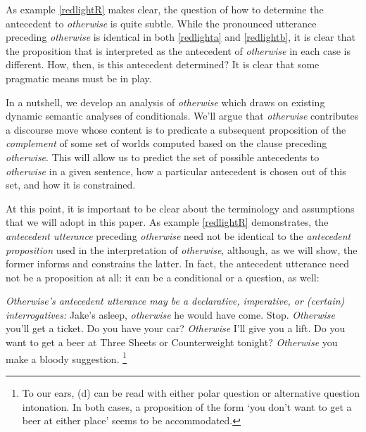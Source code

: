 
As example \ref{redlightR} makes clear, the question of how to determine the antecedent to \textit{otherwise} is quite subtle. While the pronounced utterance preceding \textit{otherwise} is identical in both \ref{redlighta} and \ref{redlightb}, it is clear that the proposition that is interpreted as the antecedent of \textit{otherwise} in each case is different. How, then, is this antecedent determined? It is clear that some pragmatic means must be in play.

In a nutshell, we develop an analysis of \textit{otherwise} which draws on existing dynamic semantic analyses of conditionals. We'll argue that \textit{otherwise} contributes a discourse move whose content is to predicate a subsequent proposition of the \textit{complement} of some	set of worlds computed based on the clause preceding \textit{otherwise}. This will allow us to predict the set of possible antecedents to \textit{otherwise} in a given sentence, how a particular antecedent is chosen out of this set, and how it is constrained. 

At this point, it is important to be clear about the terminology and assumptions that we will adopt in this paper. As example \ref{redlightR} demonstrates, the \textit{antecedent utterance} preceding \textit{otherwise} need not be identical to the \textit{antecedent proposition} used in the interpretation of \textit{otherwise}, although, as we will show, the former informs and constrains the latter. In fact, the antecedent utterance need not be a proposition at all: it can be a conditional or a question, as well: 

\pex  \label{antecedent-type}\textit{\emph{Otherwise}'s antecedent utterance may be a declarative, imperative, or (certain) interrogatives:}
\a  Jake's asleep, \textit{otherwise} he would have come.
\a  Stop. \textit{Otherwise} you'll get a ticket.
\a  Do you have your car? \textit{Otherwise} I'll give you a lift.
\a  Do you want to get a beer at Three Sheets or Counterweight tonight? \textit{Otherwise} you make a bloody suggestion.\xe
\footnote{To our ears, (d) can be read with either polar question or alternative question intonation. In both cases, a proposition of the form `you don't want to get a beer at either place' seems to be accommodated.} %

